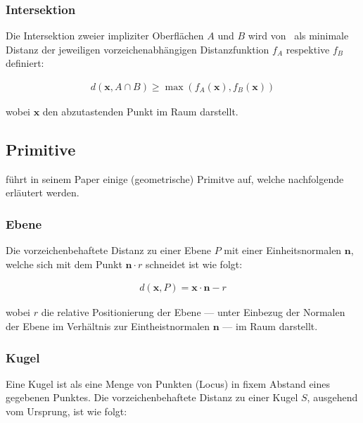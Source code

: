 \subsubsection{Intersektion}
\label{ssubsec:implicit_surfaces_ops_intersection}

Die Intersektion zweier impliziter Oberflächen $A$ und $B$ wird
von~\cite{hart_sphere_1994} als minimale Distanz der jeweiligen
vorzeichenabhängigen  Distanzfunktion $f_{A}$ respektive $f_{B}$ definiert:

\begin{gather}
    d(\bm{x}, A \cap B) \geq \max(f_{A}(\bm{x}), f_{B}(\bm{x}))
\end{gather}

wobei $\bm{x}$ den abzutastenden Punkt im Raum darstellt.

\subsection{Primitive}
\label{subsec:implicit_surfaces_primitives}

\cite{hart_sphere_1994} führt in seinem Paper einige (geometrische) Primitve
auf, welche nachfolgende erläutert werden.

\subsubsection{Ebene}
\label{ssubsec:implicit_surfaces_primitives_plane}

Die vorzeichenbehaftete Distanz zu einer Ebene $P$ mit einer Einheitsnormalen $\bm{n}$, welche sich mit dem Punkt $\bm{n} \cdot r$ schneidet ist wie folgt:

\begin{gather}
    d(\bm{x}, P) = \bm{x} \cdot \bm{n} - r
\end{gather}

wobei $r$ die relative Positionierung der Ebene --- unter Einbezug der Normalen der Ebene im Verhältnis zur Eintheistnormalen $\bm{n}$ --- im Raum darstellt.

\subsubsection{Kugel}
\label{ssubsec:implicit_surfaces_primitives_sphere}

Eine Kugel ist als eine Menge von Punkten (Locus) in fixem Abstand eines gegebenen Punktes. Die vorzeichenbehaftete Distanz zu einer Kugel $S$, ausgehend vom Ursprung, ist wie folgt:

